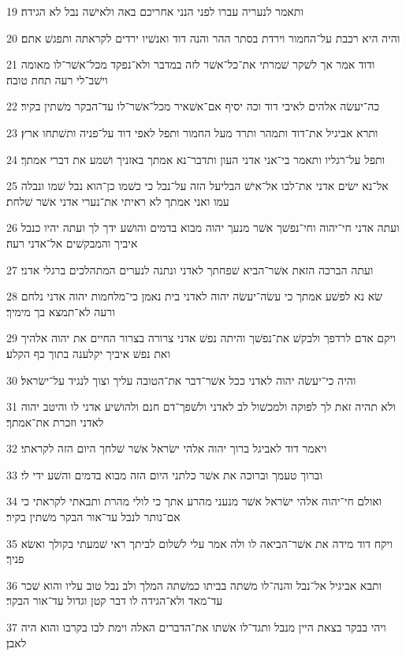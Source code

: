 \par 19 ותאמר לנעריה עברו לפני הנני אחריכם באה ולאישׁה נבל לא הגידה׃
\par 20 והיה היא רכבת על־החמור וירדת בסתר ההר והנה דוד ואנשׁיו ירדים לקראתה ותפגשׁ אתם׃
\par 21 ודוד אמר אך לשׁקר שׁמרתי את־כל־אשׁר לזה במדבר ולא־נפקד מכל־אשׁר־לו מאומה וישׁב־לי רעה תחת טובה׃
\par 22 כה־יעשׂה אלהים לאיבי דוד וכה יסיף אם־אשׁאיר מכל־אשׁר־לו עד־הבקר משׁתין בקיר׃
\par 23 ותרא אביגיל את־דוד ותמהר ותרד מעל החמור ותפל לאפי דוד על־פניה ותשׁתחו ארץ׃
\par 24 ותפל על־רגליו ותאמר בי־אני אדני העון ותדבר־נא אמתך באזניך ושׁמע את דברי אמתך׃
\par 25 אל־נא ישׂים אדני את־לבו אל־אישׁ הבליעל הזה על־נבל כי כשׁמו כן־הוא נבל שׁמו ונבלה עמו ואני אמתך לא ראיתי את־נערי אדני אשׁר שׁלחת׃
\par 26 ועתה אדני חי־יהוה וחי־נפשׁך אשׁר מנעך יהוה מבוא בדמים והושׁע ידך לך ועתה יהיו כנבל איביך והמבקשׁים אל־אדני רעה׃
\par 27 ועתה הברכה הזאת אשׁר־הביא שׁפחתך לאדני ונתנה לנערים המתהלכים ברגלי אדני׃
\par 28 שׂא נא לפשׁע אמתך כי עשׂה־יעשׂה יהוה לאדני בית נאמן כי־מלחמות יהוה אדני נלחם ורעה לא־תמצא בך מימיך׃
\par 29 ויקם אדם לרדפך ולבקשׁ את־נפשׁך והיתה נפשׁ אדני צרורה בצרור החיים את יהוה אלהיך ואת נפשׁ איביך יקלענה בתוך כף הקלע׃
\par 30 והיה כי־יעשׂה יהוה לאדני ככל אשׁר־דבר את־הטובה עליך וצוך לנגיד על־ישׂראל׃
\par 31 ולא תהיה זאת לך לפוקה ולמכשׁול לב לאדני ולשׁפך־דם חנם ולהושׁיע אדני לו והיטב יהוה לאדני וזכרת את־אמתך׃
\par 32 ויאמר דוד לאביגל ברוך יהוה אלהי ישׂראל אשׁר שׁלחך היום הזה לקראתי׃
\par 33 וברוך טעמך וברוכה את אשׁר כלתני היום הזה מבוא בדמים והשׁע ידי לי׃
\par 34 ואולם חי־יהוה אלהי ישׂראל אשׁר מנעני מהרע אתך כי לולי מהרת ותבאתי לקראתי כי אם־נותר לנבל עד־אור הבקר משׁתין בקיר׃
\par 35 ויקח דוד מידה את אשׁר־הביאה לו ולה אמר עלי לשׁלום לביתך ראי שׁמעתי בקולך ואשׂא פניך׃
\par 36 ותבא אביגיל אל־נבל והנה־לו משׁתה בביתו כמשׁתה המלך ולב נבל טוב עליו והוא שׁכר עד־מאד ולא־הגידה לו דבר קטן וגדול עד־אור הבקר׃
\par 37 ויהי בבקר בצאת היין מנבל ותגד־לו אשׁתו את־הדברים האלה וימת לבו בקרבו והוא היה לאבן׃
